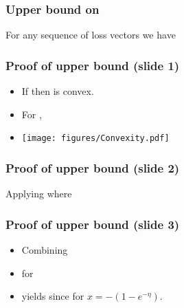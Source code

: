 \documentclass[handout]{beamer}
\begin{document}
\begin{frame}
\frametitle{Upper bound on }
\begin{lemma} 
For any sequence of loss vectors 
we have
\end{lemma}
\end{frame}

\begin{frame}
\frametitle{Proof of upper bound (slide 1)}
\begin{itemize}
\item
If  then  is convex.
\item For , 
\item
\texttt{[image: figures/Convexity.pdf]}
\end{itemize}
\end{frame}

\begin{frame}
\frametitle{Proof of upper bound (slide 2)}
Applying  where 
\end{frame}

\begin{frame}
\frametitle{Proof of upper bound (slide 3)}
\begin{itemize}
\item Combining 
\item
for  
\item yields
since  for $x = -(1-e^{-\eta})$.
\end{itemize}
\end{frame}
\end{document}
